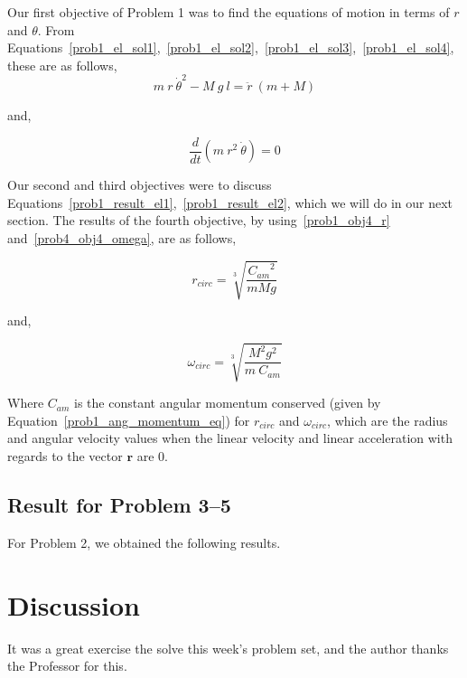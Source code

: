 \documentclass[conference]{IEEEtran}
\begin{document}
Our first objective of Problem 1 was to find the equations of motion in terms
of $r$ and $\theta$. From Equations~\ref{prob1_el_sol1},~\ref{prob1_el_sol2},~\ref{prob1_el_sol3},~\ref{prob1_el_sol4}, these are as follows,\\

\begin{equation}\label{prob1_result_el1}
    \boxed{
        m~r~\dot{\theta}^2 - M~g~l = \ddot{r}~(m + M)
    }
\end{equation}

and,

\begin{equation}\label{prob1_result_el2}
    \boxed{
        \frac{d}{dt}\left( m~r^2~\dot{\theta} \right) = 0
    }
\end{equation}

Our second and third objectives were to discuss Equations~\ref{prob1_result_el1},~\ref{prob1_result_el2},
which we will do in our next section. The results of the fourth objective, by using~\ref{prob1_obj4_r}
and~\ref{prob4_obj4_omega}, are as follows,

\begin{equation}
    \boxed{r_{circ} = \sqrt[3]{\frac{{C_{am}}^2}{mMg}}}
\end{equation}

and,

\begin{equation}
    \boxed{\omega_{circ} = \sqrt[3]{\frac{M^2g^2}{m~C_{am}}}}
\end{equation}

Where $C_{am}$ is the constant angular momentum conserved (given by Equation~\ref{prob1_ang_momentum_eq}) for $r_{circ}$ and $\omega_{circ}$,
which are the radius and angular velocity values when the linear velocity and linear acceleration with
regards to the vector $\textbf{r}$ are 0.

\subsection{Result for Problem 3--5}

For Problem 2, we obtained the following results.

\section{Discussion}

It was a great exercise the solve this week's problem set, and the author thanks
the Professor for this.


\end{document}
